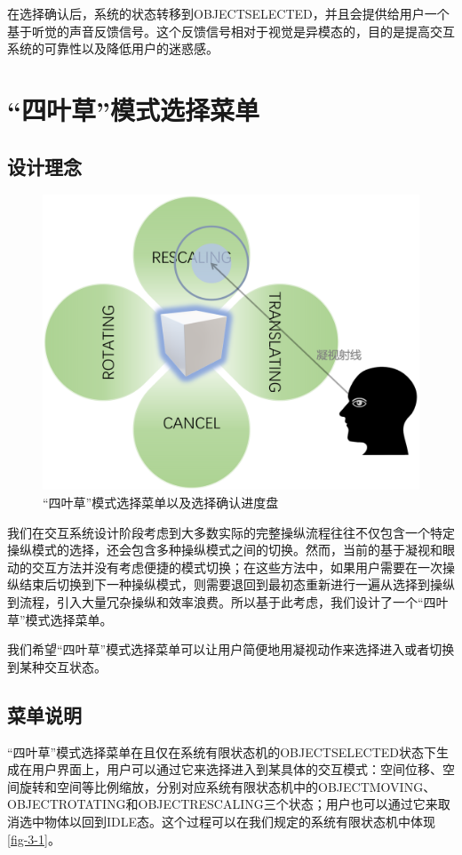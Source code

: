 在选择确认后，系统的状态转移到OBJECT\us SELECTED，并且会提供给用户一个基于听觉的声音反馈信号。这个反馈信号相对于视觉是异模态的，目的是提高交互系统的可靠性以及降低用户的迷惑感。

\section{“四叶草”模式选择菜单}\label{Clover}

\subsection{设计理念}

\begin{figure}[t!]
    \centering
    \includegraphics[width=.55\textwidth]{figure/clover.png}
    \caption{“四叶草”模式选择菜单以及选择确认进度盘}
    \label{fig-3-4}
\end{figure}

我们在交互系统设计阶段考虑到大多数实际的完整操纵流程往往不仅包含一个特定操纵模式的选择，还会包含多种操纵模式之间的切换。然而，当前的基于凝视和眼动的交互方法并没有考虑便捷的模式切换；在这些方法中，如果用户需要在一次操纵结束后切换到下一种操纵模式，则需要退回到最初态重新进行一遍从选择到操纵到流程，引入大量冗杂操纵和效率浪费。所以基于此考虑，我们设计了一个“四叶草”模式选择菜单。

我们希望“四叶草”模式选择菜单可以让用户简便地用凝视动作来选择进入或者切换到某种交互状态。

\subsection{菜单说明}

“四叶草”模式选择菜单在且仅在系统有限状态机的OBJECT\us SELECTED状态下生成在用户界面上，用户可以通过它来选择进入到某具体的交互模式：空间位移、空间旋转和空间等比例缩放，分别对应系统有限状态机中的OBJECT\us MOVING、OBJECT\us ROTATING和OBJECT\us RESCALING三个状态；用户也可以通过它来取消选中物体以回到IDLE态。这个过程可以在我们规定的系统有限状态机中体现\ref{fig-3-1}。

